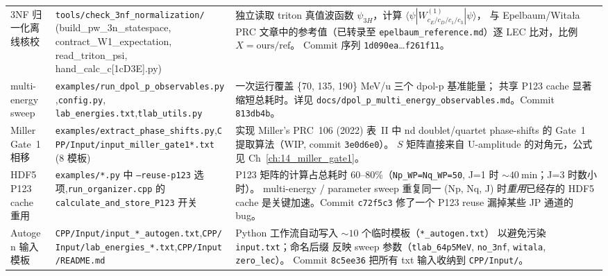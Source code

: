 \begin{table}[t]
\begin{tabular}{@{}p{30mm}p{55mm}p{60mm}@{}}
3NF 归一化离线核校
& \texttt{tools/check\_3nf\_normalization/} (build\_pw\_3n\_statespace, contract\_W1\_expectation, read\_triton\_psi, hand\_calc\_c[1cD3E].py)
& 独立读取 triton 真值波函数 $\psi_{3H}$，计算 $\langle\psi|W^{(1)}_{c_E/c_D/c_1/c_3}|\psi\rangle$，
  与 Epelbaum/Witała PRC 文章中的参考值（已转录至
  \texttt{epelbaum\_reference.md}）逐 LEC 比对，比例 $X = \text{ours}/\text{ref}$。
  Commit 序列 \texttt{1d090ea}\ldots\texttt{f261f11}。\\

multi-energy sweep
& \texttt{examples/run\_dpol\_p\_observables.py},\newline\texttt{config.py}, \texttt{lab\_energies.txt},\newline\texttt{tlab\_utils.py}
& 一次运行覆盖 \{70, 135, 190\} MeV/u 三个 dpol-p 基准能量；
  共享 P123 cache 显著缩短总耗时。详见
  \texttt{docs/dpol\_p\_multi\_energy\_observables.md}。Commit \texttt{813db4b}。\\

Miller Gate~1 相移
& \texttt{examples/extract\_phase\_shifts.py},\newline\texttt{CPP/Input/input\_miller\_gate1*.txt} (8 模板)
& 实现 Miller's PRC~106 (2022) 表~II 中 nd doublet/quartet phase-shifts 的
  Gate~1 提取算法（WIP, commit \texttt{3e0d6e0}）。
  $S$ 矩阵直接来自 U-amplitude 的对角元，公式见
  Ch~\ref{ch:14_miller_gate1}。\\

HDF5 P123 cache 重用
& \texttt{examples/*.py} 中 \texttt{--reuse-p123} 选项,\newline\texttt{run\_organizer.cpp} 的 \texttt{calculate\_and\_store\_P123} 开关
& P123 矩阵的计算占总耗时 60--80\%（\texttt{Np\_WP=Nq\_WP=50}, J=1 时
  ${\sim}\SI{40}{\minute}$；J=3 时数小时）。
  multi-energy / parameter sweep 重复同一 (Np, Nq, J) 时\emph{重用}已经存的
  HDF5 cache 是关键加速。Commit \texttt{c72f5c3} 修了一个 P123 reuse
  漏掉某些 JP 通道的 bug。 \\

Autogen 输入模板
& \texttt{CPP/Input/input\_*\_autogen.txt},\newline\texttt{CPP/Input/lab\_energies\_*.txt},\newline\texttt{CPP/Input/README.md}
& Python 工作流自动写入 ${\sim}10$ 个临时模板（\texttt{*\_autogen.txt}）
  以避免污染 \texttt{input.txt}；命名后缀
  反映 sweep 参数（\texttt{tlab\_64p5MeV}, \texttt{no\_3nf}, \texttt{witala}, \texttt{zero\_lec}）。
  Commit \texttt{8c5ee36} 把所有 txt 输入收纳到 \texttt{CPP/Input/}。\\


\end{tabular}
\end{table}
